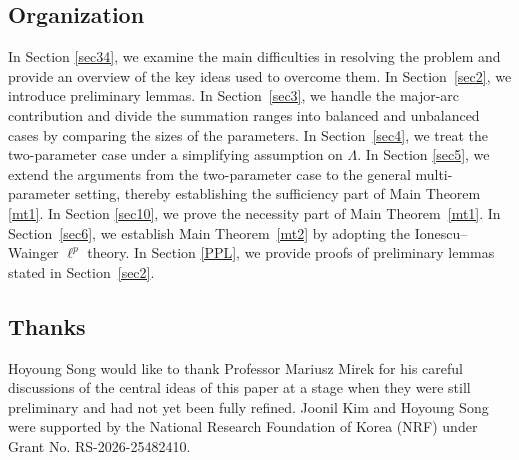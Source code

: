 \documentclass[10pt,a4paper]{amsart}
\numberwithin{equation}{section}
\begin{document}
\subsection{Organization}
In Section \ref{sec34}, we examine the main difficulties in resolving the problem and provide an overview of the key ideas used to overcome them. In Section~\ref{sec2}, we introduce preliminary lemmas. In Section~\ref{sec3}, we handle the major-arc contribution and divide the
summation ranges into balanced and unbalanced cases by comparing
the sizes of the parameters. In Section~\ref{sec4}, we treat the two-parameter case under a simplifying assumption on $\Lambda$.
In Section \ref{sec5}, we extend the arguments from the two-parameter case to the general multi-parameter setting, thereby establishing the sufficiency part of Main Theorem \ref{mt1}.
In Section \ref{sec10}, we prove the necessity part of Main Theorem~\ref{mt1}.
In Section~\ref{sec6}, we establish Main Theorem~\ref{mt2} by adopting the Ionescu–Wainger $\ell^{p}$ theory.
In  Section \ref{PPL}, we provide proofs of preliminary lemmas stated in Section~\ref{sec2}.





\subsection{Thanks}
Hoyoung Song would like to thank Professor Mariusz Mirek for his careful discussions of the central ideas of this paper at a stage when they were still preliminary and had not yet been fully refined.
Joonil Kim and Hoyoung Song were supported by the National Research Foundation of Korea (NRF) under Grant No. RS-2026-25482410.
\end{document}
